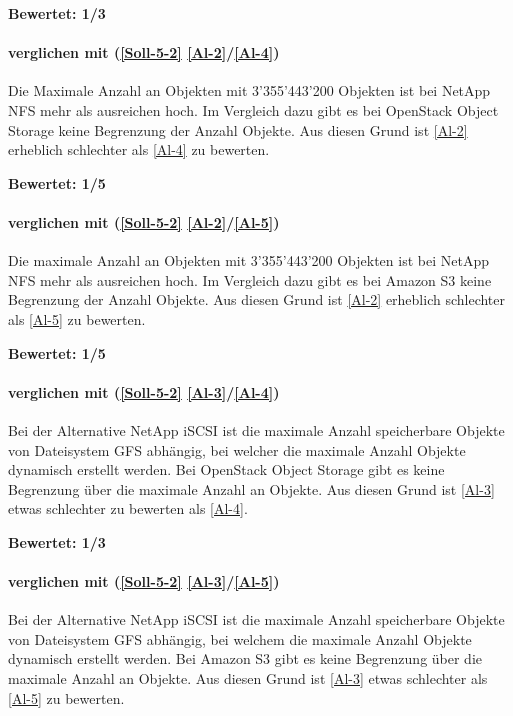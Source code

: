 \textbf{Bewertet: 1/3}

\paragraph*{  verglichen mit  (\ref{Soll-5-2} \ref{Al-2}/\ref{Al-4})}
Die Maximale Anzahl an Objekten mit 3'355'443'200 Objekten ist bei NetApp NFS mehr als ausreichen hoch. Im Vergleich dazu gibt es bei OpenStack Object Storage keine Begrenzung der Anzahl Objekte. Aus diesen Grund ist  \ref{Al-2} erheblich schlechter als  \ref{Al-4} zu bewerten.

\textbf{Bewertet: 1/5}

\paragraph*{  verglichen mit  (\ref{Soll-5-2} \ref{Al-2}/\ref{Al-5})}
Die maximale Anzahl an Objekten mit 3'355'443'200 Objekten ist bei NetApp NFS mehr als ausreichen hoch. Im Vergleich dazu gibt es bei Amazon S3 keine Begrenzung der Anzahl Objekte. Aus diesen Grund ist  \ref{Al-2} erheblich schlechter als  \ref{Al-5} zu bewerten.

\textbf{Bewertet: 1/5}

\paragraph*{  verglichen mit  (\ref{Soll-5-2} \ref{Al-3}/\ref{Al-4})}
Bei der Alternative NetApp iSCSI ist die maximale Anzahl speicherbare Objekte von Dateisystem GFS abhängig, bei welcher die maximale Anzahl Objekte dynamisch erstellt werden. Bei OpenStack Object Storage gibt es keine Begrenzung über die maximale Anzahl an Objekte. Aus diesen Grund ist  \ref{Al-3} etwas schlechter zu bewerten als  \ref{Al-4}.

\textbf{Bewertet: 1/3}

\paragraph*{  verglichen mit  (\ref{Soll-5-2} \ref{Al-3}/\ref{Al-5})}
Bei der Alternative NetApp iSCSI ist die maximale Anzahl speicherbare Objekte von Dateisystem GFS abhängig, bei welchem die maximale Anzahl Objekte dynamisch erstellt werden. Bei Amazon S3 gibt es keine Begrenzung über die maximale Anzahl an Objekte. Aus diesen Grund ist  \ref{Al-3} etwas schlechter als  \ref{Al-5} zu bewerten.

